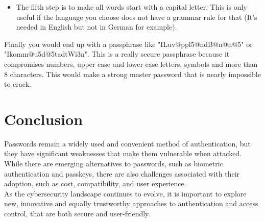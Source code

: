 \documentclass[conference]{IEEEtran}
\begin{document}
\begin{enumerate}
\begin{itemize}
            \item The fifth step is to make all words start with a capital letter. This is only useful if the language you choose does not have a grammar rule for that (It's needed in English but not in German for example).
        \end{itemize}
        Finally you would end up with a passphrase like "ILuv@ppl5@ndB@n@n@5" or "Ikomm@u5d@5tadtWi3n". This is a really secure passphrase because it compromises numbers, upper case and lower case letters, symbols and more than 8 characters. This would make a strong master password that is nearly impossible to crack.
\end{enumerate}


\section{Conclusion}

Passwords remain a widely used and convenient method of authentication, but they have significant weaknesses that make them vulnerable when attacked. While there are emerging alternatives to passwords, such as biometric authentication and passkeys, there are also challenges associated with their adoption, such as cost, compatibility, and user experience.\\
As the cybersecurity landscape continues to evolve, it is important to explore new, innovative and equally trustworthy approaches to authentication and access control, that are both secure and user-friendly.


\listoffigures
\end{document}
